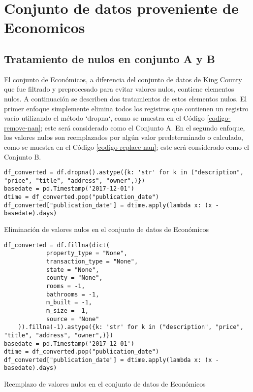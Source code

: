 \newpage
\section{Conjunto de datos proveniente de Economicos}
\subsection{Tratamiento de nulos en conjunto A y B}
El conjunto de Económicos, a diferencia del conjunto de datos de King County que fue filtrado y preprocesado para evitar valores nulos, contiene elementos nulos. A continuación se describen dos tratamientos de estos elementos nulos. El primer enfoque simplemente elimina todos los registros que contienen un registro vacío utilizando el método `dropna`, como se muestra en el Código \ref{codigo-remove-nan}; este será considerado como el Conjunto A. En el segundo enfoque, los valores nulos son reemplazados por algún valor predeterminado o calculado, como se muestra en el Código \ref{codigo-replace-nan}; este será considerado como el Conjunto B.

\begin{listing}[H]
    \begin{verbatim}
df_converted = df.dropna().astype({k: 'str' for k in ("description", "price", "title", "address", "owner",)})
basedate = pd.Timestamp('2017-12-01')
dtime = df_converted.pop("publication_date")
df_converted["publication_date"] = dtime.apply(lambda x: (x - basedate).days)
    \end{verbatim}
\caption{Eliminación de valores nulos en el conjunto de datos de Económicos}
\label{codigo-remove-nan}
\end{listing}

\begin{listing}[H]
    \begin{verbatim}
df_converted = df.fillna(dict(
            property_type = "None",
            transaction_type = "None",
            state = "None",
            county = "None",
            rooms = -1,
            bathrooms = -1,
            m_built = -1,
            m_size = -1,
            source = "None"
    )).fillna(-1).astype({k: 'str' for k in ("description", "price", "title", "address", "owner",)})
basedate = pd.Timestamp('2017-12-01')
dtime = df_converted.pop("publication_date")
df_converted["publication_date"] = dtime.apply(lambda x: (x - basedate).days)
    \end{verbatim}
\caption{Reemplazo de valores nulos en el conjunto de datos de Económicos}
\label{codigo-replace-nan}
\end{listing}

